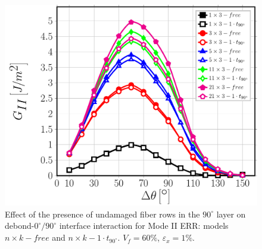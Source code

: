 \documentclass[review]{elsarticle}
\begin{document}
\begin{figure}[!h]
\centering
\includegraphics[width=\textwidth]{nxk-1-vf60-GII.pdf}
\caption{Effect of the presence of undamaged fiber rows in the $90^{\circ}$ layer on debond-$0^{\circ}/90^{\circ}$ interface interaction for Mode II ERR: models $n\times k-free$ and $n\times k-1\cdot t_{90^{\circ}}$. $V_{f}=60\%$, $\varepsilon_{x}=1\%$.}\label{fig:nkGII}
\end{figure}
\end{document}
